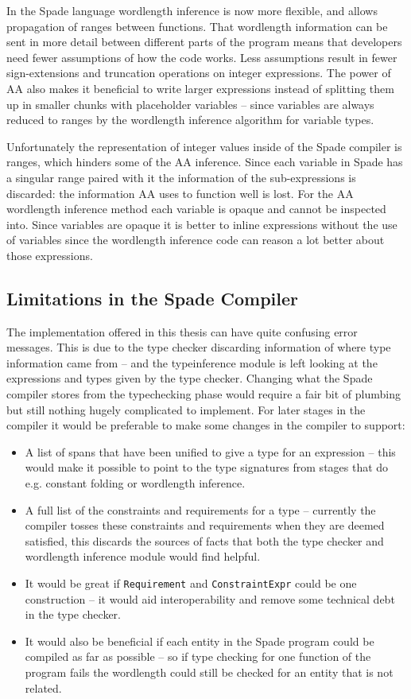 In the Spade language wordlength inference is now more flexible, and allows propagation of ranges between functions. That wordlength information can be sent in more detail between different parts of the program means that developers need fewer assumptions of how the code works. Less assumptions result in fewer sign-extensions and truncation operations on integer expressions. The power of AA also makes it beneficial to write larger expressions instead of splitting them up in smaller chunks with placeholder variables -- since variables are always reduced to ranges by the wordlength inference algorithm for variable types.

Unfortunately the representation of integer values inside of the Spade compiler is ranges, which hinders some of the AA inference. Since each variable in Spade has a singular range paired with it the information of the sub-expressions is discarded: the information AA uses to function well is lost. For the AA wordlength inference method each variable is opaque and cannot be inspected into. Since variables are opaque it is better to inline expressions without the use of variables since the wordlength inference code can reason a lot better about those expressions.

\subsection{Limitations in the Spade Compiler}
The implementation offered in this thesis can have quite confusing error messages. This is due to the type checker discarding information of where type information came from -- and the typeinference module is left looking at the expressions and types given by the type checker. Changing what the Spade compiler stores from the typechecking phase would require a fair bit of plumbing but still nothing hugely complicated to implement. For later stages in the compiler it would be preferable to make some changes in the compiler to support:
\begin{itemize}
  \item A list of spans that have been unified to give a type for an expression -- this would make it possible to point to the type signatures from stages that do e.g. constant folding or wordlength inference.
  \item A full list of the constraints and requirements for a type -- currently the compiler tosses these constraints and requirements when they are deemed satisfied, this discards the sources of facts that both the type checker and wordlength inference module would find helpful.
  \item It would be great if \verb+Requirement+ and \verb+ConstraintExpr+ could be one construction -- it would aid interoperability and remove some technical debt in the type checker.
  \item It would also be beneficial if each entity in the Spade program could be compiled as far as possible -- so if type checking for one function of the program fails the wordlength could still be checked for an entity that is not related.
\end{itemize}


